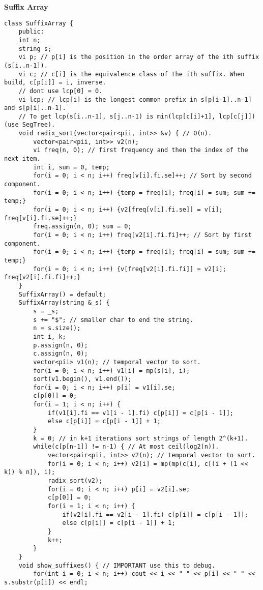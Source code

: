 \documentclass[a4paper,10pt]{article}
\newcommand{\titleAlg}[1]{\vspace{-10pt}
\begin{center}\textbf{#1}\end{center} \vspace{-10pt}}
\begin{document}
\titleAlg{Suffix Array}
\begin{multicols}{2}
\begin{verbatim}
class SuffixArray {
    public:
    int n;
    string s;
    vi p; // p[i] is the position in the order array of the ith suffix (s[i..n-1]).
    vi c; // c[i] is the equivalence class of the ith suffix. When build, c[p[i]] = i, inverse.
    // dont use lcp[0] = 0.
    vi lcp; // lcp[i] is the longest common prefix in s[p[i-1]..n-1] and s[p[i]..n-1].
    // To get lcp(s[i..n-1], s[j..n-1) is min(lcp[c[i]+1], lcp[c[j]]) (use SegTree).
    void radix_sort(vector<pair<pii, int>> &v) { // O(n).
        vector<pair<pii, int>> v2(n);
        vi freq(n, 0); // first frequency and then the index of the next item.
        int i, sum = 0, temp;
        for(i = 0; i < n; i++) freq[v[i].fi.se]++; // Sort by second component.
        for(i = 0; i < n; i++) {temp = freq[i]; freq[i] = sum; sum += temp;}
        for(i = 0; i < n; i++) {v2[freq[v[i].fi.se]] = v[i]; freq[v[i].fi.se]++;}
        freq.assign(n, 0); sum = 0;
        for(i = 0; i < n; i++) freq[v2[i].fi.fi]++; // Sort by first component.
        for(i = 0; i < n; i++) {temp = freq[i]; freq[i] = sum; sum += temp;}
        for(i = 0; i < n; i++) {v[freq[v2[i].fi.fi]] = v2[i]; freq[v2[i].fi.fi]++;}
    }
    SuffixArray() = default;
    SuffixArray(string &_s) {
        s = _s;
        s += "$"; // smaller char to end the string.
        n = s.size();
        int i, k;
        p.assign(n, 0);
        c.assign(n, 0);
        vector<pii> v1(n); // temporal vector to sort.
        for(i = 0; i < n; i++) v1[i] = mp(s[i], i);
        sort(v1.begin(), v1.end());
        for(i = 0; i < n; i++) p[i] = v1[i].se;
        c[p[0]] = 0;
        for(i = 1; i < n; i++) {
            if(v1[i].fi == v1[i - 1].fi) c[p[i]] = c[p[i - 1]];
            else c[p[i]] = c[p[i - 1]] + 1;
        }
        k = 0; // in k+1 iterations sort strings of length 2^(k+1).
        while(c[p[n-1]] != n-1) { // At most ceil(log2(n)). 
            vector<pair<pii, int>> v2(n); // temporal vector to sort.
            for(i = 0; i < n; i++) v2[i] = mp(mp(c[i], c[(i + (1 << k)) % n]), i);
            radix_sort(v2);
            for(i = 0; i < n; i++) p[i] = v2[i].se;
            c[p[0]] = 0;
            for(i = 1; i < n; i++) {
                if(v2[i].fi == v2[i - 1].fi) c[p[i]] = c[p[i - 1]];
                else c[p[i]] = c[p[i - 1]] + 1;
            }
            k++;
        }
    }
    void show_suffixes() { // IMPORTANT use this to debug.
        for(int i = 0; i < n; i++) cout << i << " " << p[i] << " " << s.substr(p[i]) << endl;

\end{verbatim}
\end{multicols}
\end{document}
